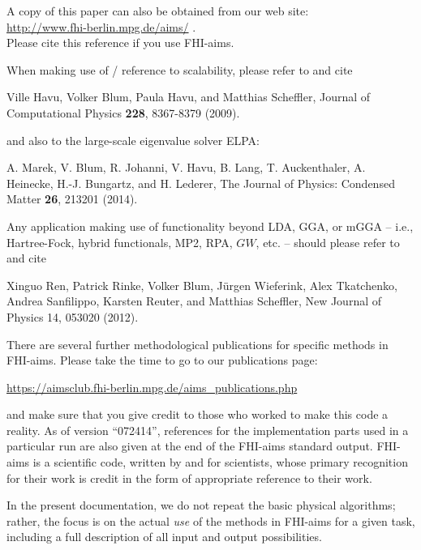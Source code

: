 A copy of this paper can also be obtained from our web site: \\
\url{http://www.fhi-berlin.mpg.de/aims/} . \\ Please cite this reference if you use
FHI-aims. 

When making use of / reference to scalability, please refer to
and cite 

\begin{center}
\parbox[c]{0.8\textwidth}
{\small
Ville Havu, Volker Blum, Paula Havu, and Matthias Scheffler, Journal of
Computational Physics \textbf{228}, 8367-8379 (2009).
}
\end{center}

and also to the large-scale eigenvalue solver ELPA:

\begin{center}
\parbox[c]{0.8\textwidth}
{\small
A. Marek, V. Blum, R. Johanni, V. Havu, B. Lang, T. Auckenthaler, 
A. Heinecke, H.-J. Bungartz, and H. Lederer, 
The Journal of Physics: Condensed Matter \textbf{26}, 213201 (2014). 
}
\end{center}

Any application making use of functionality beyond LDA, GGA, or mGGA
-- i.e., Hartree-Fock, hybrid functionals, MP2, RPA, $GW$, etc. --
should please refer to and cite

\begin{center}
\parbox[c]{0.8\textwidth}
{\small
Xinguo Ren, Patrick Rinke, Volker Blum, J\"urgen Wieferink, Alex
Tkatchenko, Andrea Sanfilippo, Karsten Reuter, and Matthias Scheffler,
New Journal of Physics 14, 053020 (2012).
}
\end{center}

There are several further methodological publications for specific methods 
in FHI-aims. Please take the time to go to our publications page: 

\url{https://aimsclub.fhi-berlin.mpg.de/aims_publications.php}

and make sure that you give credit to those who worked to make this
code a reality. As of version ``072414'', references for the implementation
parts used in a particular run are also given at the end of the
FHI-aims standard output. FHI-aims is a scientific code, written by and for
scientists, whose primary recognition for their work is credit in the
form of appropriate reference to their work.

In the present documentation, we do not repeat the basic physical
algorithms; rather, the focus is on the actual \emph{use} of the methods in
FHI-aims for a given task, including a full description of all input and
output possibilities.  

